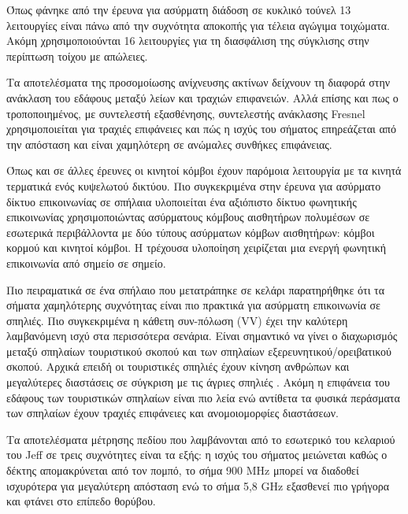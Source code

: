 \documentclass[12pt, greek]{article}
\begin{document}
\begin{multicols*}{2}
        Όπως φάνηκε από την έρευνα για ασύρματη διάδοση σε κυκλικό τούνελ \cite{dudley_wireless_2005}
        13 λειτουργίες είναι πάνω από την συχνότητα αποκοπής για τέλεια αγώγιμα τοιχώματα. Ακόμη
        χρησιμοποιούνται 16 λειτουργίες για τη διασφάλιση της σύγκλισης στην περίπτωση τοίχου 
        με απώλειες.

        Τα αποτελέσματα της προσομοίωσης ανίχνευσης ακτίνων \cite{soo_investigation_2018} δείχνουν
        τη διαφορά στην ανάκλαση του εδάφους μεταξύ λείων και τραχιών επιφανειών. Αλλά επίσης και
        πως ο τροποποιημένος, με συντελεστή εξασθένησης, συντελεστής ανάκλασης Fresnel χρησιμοποιείται
        για τραχιές επιφάνειες και πώς η ισχύς του σήματος επηρεάζεται από την απόσταση και είναι 
        χαμηλότερη σε ανώμαλες συνθήκες επιφάνειας.

        Όπως και σε άλλες έρευνες οι κινητοί κόμβοι έχουν παρόμοια λειτουργία με τα κινητά τερματικά
        ενός κυψελωτού δικτύου. Πιο συγκεκριμένα στην έρευνα για ασύρματο δίκτυο επικοινωνίας σε
        σπήλαια \cite{yavuz_-cave_2009} υλοποιείται ένα αξιόπιστο δίκτυο φωνητικής επικοινωνίας
        χρησιμοποιώντας ασύρματους κόμβους αισθητήρων πολυμέσων σε εσωτερικά περιβάλλοντα με δύο
        τύπους ασύρματων κόμβων αισθητήρων: κόμβοι κορμού και κινητοί κόμβοι. Η τρέχουσα υλοποίηση
        χειρίζεται μια ενεργή φωνητική επικοινωνία από σημείο σε σημείο.

        Πιο πειραματικά σε ένα σπήλαιο που μετατράπηκε σε κελάρι \cite{soo_propagation_2018}
        παρατηρήθηκε ότι τα σήματα χαμηλότερης συχνότητας είναι πιο πρακτικά για ασύρματη
        επικοινωνία σε σπηλιές. Πιο συγκεκριμένα η κάθετη συν-πόλωση (VV) έχει την καλύτερη
        λαμβανόμενη ισχύ στα περισσότερα σενάρια.
        Είναι σημαντικό να γίνει ο διαχωρισμός μεταξύ σπηλαίων τουριστικού σκοπού και των σπηλαίων
        εξερευνητικού/ορειβατικού σκοπού. Αρχικά επειδή οι τουριστικές σπηλιές έχουν κίνηση ανθρώπων
        και μεγαλύτερες διαστάσεις σε σύγκριση με τις άγριες σπηλιές \cite{soo_propagation_2018}.
        Ακόμη η επιφάνεια του εδάφους των τουριστικών σπηλαίων είναι πιο λεία ενώ αντίθετα τα φυσικά
        περάσματα των σπηλαίων έχουν τραχιές επιφάνειες και ανομοιομορφίες διαστάσεων.

        Τα αποτελέσματα μέτρησης πεδίου που λαμβάνονται από το εσωτερικό του κελαριού του
        Jeff \cite{soo_propagation_2018} σε τρεις συχνότητες είναι τα εξής: η ισχύς του σήματος
        μειώνεται καθώς ο δέκτης απομακρύνεται από τον πομπό, το σήμα 900 MHz μπορεί να διαδοθεί
        ισχυρότερα για μεγαλύτερη απόσταση ενώ το σήμα 5,8 GHz εξασθενεί πιο γρήγορα και φτάνει στο 
        επίπεδο θορύβου.


\end{multicols*}
\end{document}
